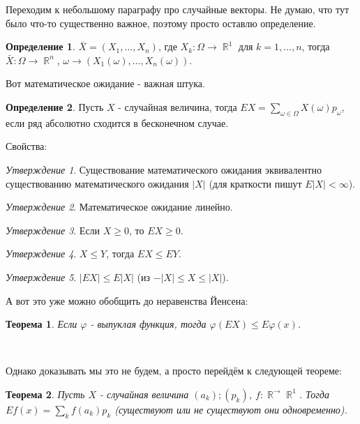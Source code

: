 \documentclass[a4paper,100pt]{article}
\theoremstyle{indented}
\newtheorem{theorem}{Теорема}
\theoremstyle{definition}
\newtheorem{defn}{Определение}
\theoremstyle{remark}
\newtheorem{stat}{Утверждение}
\DeclareMathOperator{\RR}{\mathbb{R}}
\begin{document}
Переходим к небольшому параграфу про случайные векторы. Не думаю, что тут было что-то существенно важное, поэтому просто оставлю определение.

\begin{defn}
    $\bar{X}=(X_1, \ldots, X_n)$, где $X_k:\Omega \rightarrow \RR^1$ для $k=1, \ldots, n$, тогда $\bar{X}:\Omega \rightarrow \RR^n$, $\omega \rightarrow (X_1(\omega), \ldots, X_n(\omega))$. 
\end{defn}

Вот математическое ожидание - важная штука. 

\begin{defn}
    Пусть $X$ - случайная величина, тогда $EX = \sum_{\omega \in \Omega} X(\omega)p_\omega$, если ряд абсолютно сходится в бесконечном случае.
\end{defn}

Свойства: 

\begin{stat}
    Существование математического ожидания эквивалентно существованию математического ожидания $|X|$ (для краткости пишут $E|X|<\infty$). 
\end{stat}

\begin{stat}
    Математическое ожидание линейно.
\end{stat}

\begin{stat}
    Если $X\geq 0$, то $EX\geq 0$. 
\end{stat}

\begin{stat}
    $X\leq Y$, тогда $EX\leq EY$. 
\end{stat}

\begin{stat}
    $|EX|\leq E|X|$ (из $-|X|\leq X \leq |X|$). 
\end{stat}

А вот это уже можно обобщить до неравенства Йенсена: \\

\begin{theorem}
    Если $\varphi$ - выпуклая функция, тогда $\varphi(EX)\leq E\varphi(x)$. 
\end{theorem} \

Однако доказывать мы это не будем, а просто перейдём к следующей теореме: \\

\begin{theorem}
    Пусть $X$ - случайная величина $(a_k); (p_k)$, $f:\RR^\rightarrow \RR^1$. Тогда $Ef(x)=\sum_k f(a_k)p_k$ (существуют или не существуют они одновременно). 
\end{theorem}
\end{document}
